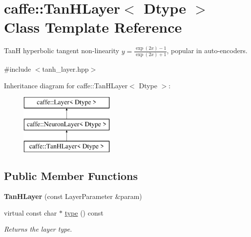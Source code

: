 \hypertarget{classcaffe_1_1TanHLayer}{}\section{caffe\+:\+:Tan\+H\+Layer$<$ Dtype $>$ Class Template Reference}
\label{classcaffe_1_1TanHLayer}


TanH hyperbolic tangent non-\/linearity $ y = \frac{\exp(2x) - 1}{\exp(2x) + 1} $, popular in auto-\/encoders.  




{\ttfamily \#include $<$tanh\+\_\+layer.\+hpp$>$}

Inheritance diagram for caffe\+:\+:Tan\+H\+Layer$<$ Dtype $>$\+:\begin{figure}[H]
\begin{center}
\leavevmode
\includegraphics[height=3.000000cm]{classcaffe_1_1TanHLayer}
\end{center}
\end{figure}
\subsection*{Public Member Functions}
\begin{DoxyCompactItemize}
\item 
{\bfseries Tan\+H\+Layer} (const Layer\+Parameter \&param)\hypertarget{classcaffe_1_1TanHLayer_a71e5977bc3aa2d0fa7a05a956178f25b}{}\label{classcaffe_1_1TanHLayer_a71e5977bc3aa2d0fa7a05a956178f25b}

\item 
virtual const char $\ast$ \hyperlink{classcaffe_1_1TanHLayer_a562648aab7ee89a9d7059d8894b9b223}{type} () const \hypertarget{classcaffe_1_1TanHLayer_a562648aab7ee89a9d7059d8894b9b223}{}\label{classcaffe_1_1TanHLayer_a562648aab7ee89a9d7059d8894b9b223}

\begin{DoxyCompactList}\small\item\em Returns the layer type. \end{DoxyCompactList}\end{DoxyCompactItemize}
